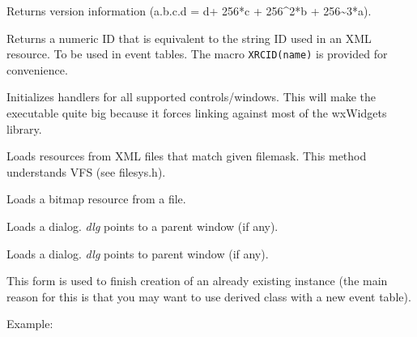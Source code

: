 \label{wxxmlresourcegetversion}


Returns version information (a.b.c.d = d+ 256*c + 256\textasciicircum2*b + 256\textasciitilde3*a).


\label{wxxmlresourcegetxmlid}


Returns a numeric ID that is equivalent to the string ID used in an XML
resource. To be used in event tables.
The macro {\tt XRCID(name)} is provided for convenience.


\label{wxxmlresourceinitallhandlers}


Initializes handlers for all supported controls/windows. This will
make the executable quite big because it forces linking against
most of the wxWidgets library.


\label{wxxmlresourceload}


Loads resources from XML files that match given filemask.
This method understands VFS (see filesys.h).


\label{wxxmlresourceloadbitmap}


Loads a bitmap resource from a file.


\label{wxxmlresourceloaddialog}


Loads a dialog. {\it dlg} points to a parent window (if any).


Loads a dialog. {\it dlg} points to parent window (if any).

This form is used to finish creation of an already existing instance (the main reason
for this is that you may want to use derived class with a new event table).

Example:

